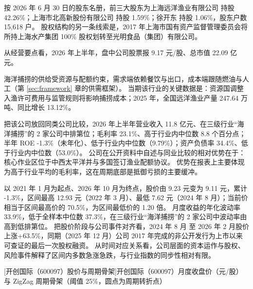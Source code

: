  按 2026 年 6 月 30 日的股东名册，前三大股东为上海远洋渔业有限公司 持股 42.26\%；上海市北高新股份有限公司 持股 1.59\%；徐开东 持股 1.06\%，股东户数 15,618 户。 股权结构的另一条线索是，2017 年上海市国有资产监督管理委员会将所持上海水产集团 100\% 股权划转至光明食品（集团）有限公司。

 从经营要点看，2026 年上半年，盘中公司股票报 9.17 元/股、总市值 22.09 亿元。

 海洋捕捞的供给受资源与配额约束，需求端依赖餐饮与出口，成本端跟随燃油与人工（第 \ref{sec:framework} 章的供需框架）。 当期该行业的关键数据是：资源国调整入渔许可费用与监管规则将影响捕捞成本；2025 年，全国远洋渔业产量 247.64 万吨、同比增长 13.12\%。

 把该公司放回同类公司比较，2026 年上半年营业收入 11.8 亿元、在三级行业“海洋捕捞”的 2 家公司中排第位；毛利率 23.1\%、高于行业内中位数 8.8 个百分点；半年 ROE -1.3\%（未年化）、低于行业内中位数（9.79\%）；资产负债率 34.4\%、低于行业内中位数（53.0\%）。 公司在公开资料中自述与同业比较的相对优势在于：核心作业区位于中西太平洋并与多国签订渔业配额协议。 优势在报表上主要体现为高于行业平均的毛利率，这在周期底部是抵御亏损的主要缓冲。

 以 2021 年 1 月为起点、2026 年 10 月为终点，股价由 9.23 元变为 9.11 元，累计 -1.3\%，区间最高 12.93 元（2022 年 3 月）、最低 7.62 元（2024 年 8 月）；当前价相当于区间最高价的 70.5\%，为区间最低价的 1.20 倍。 月度收益的年化波动率 33.9\%，低于全样本中位数 37.3\%，在三级行业“海洋捕捞”的 2 家公司中波动率由高到低排第位。 把股价阶段与公司事件对齐看，2024 年 8 月 至 2026 年 2 月股价上涨+63.5\%，同期（2025 年 12 月）公司 2017 年完成的非公开发行为上市以来可查证的最后一次股权融资。 从时间对应关系看，公司层面的资本运作与股权、风险事件解释了区间内多数急涨急跌，与行业指数的同步性相对有限。

\begin{center}
\begin{minipage}{\textwidth}\centering
{}

[开创国际（600097）股价与周期骨架]{开创国际（600097）月度收盘价（元/股）与 ZigZag 周期骨架（阈值 25\%，圆点为周期转折点）}
\end{minipage}
\end{center}


